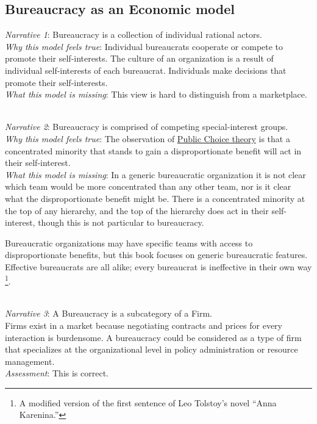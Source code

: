 \subsection*{Bureaucracy as an Economic model}

\textit{Narrative 1}: Bureaucracy is a collection of individual rational actors. \\
\textit{Why this model feels true}: Individual bureaucrats cooperate or compete to promote their self-interests.
The culture of an organization is a result of individual self-interests of each bureaucrat.
Individuals make decisions that promote their self-interests. \\
\textit{What this model is missing}: This view is hard to distinguish from a marketplace. 

\ \\
\textit{Narrative 2}: Bureaucracy is comprised of competing special-interest groups. \\
\textit{Why this model feels true}: The observation of \href{https://en.wikipedia.org/wiki/Public_choice}{Public Choice theory} 
is that a concentrated minority that stands to gain a disproportionate benefit will act in their self-interest. \\
\textit{What this model is missing}: In a generic bureaucratic organization it is not clear which team would be more concentrated than any other team, nor is it clear what the disproportionate benefit might be. There is a concentrated minority at the top of any hierarchy, and the top of the hierarchy does act in their self-interest, though this is not particular to bureaucracy.

Bureaucratic organizations may have specific teams with access to disproportionate benefits, but this book focuses on generic bureaucratic features. Effective bureaucrats are all alike; every bureaucrat is ineffective in their own way
\footnote{A modified version of the first sentence of Leo Tolstoy's novel ``Anna Karenina.''}.



\ \\
\textit{Narrative 3}: A Bureaucracy is a subcategory of a Firm. \\
Firms exist in a market because negotiating contracts and prices for every interaction is burdensome. 
A bureaucracy could be considered as a type of firm that specializes at the organizational level in policy administration or resource management. \\
\textit{Assessment}: This is correct.

